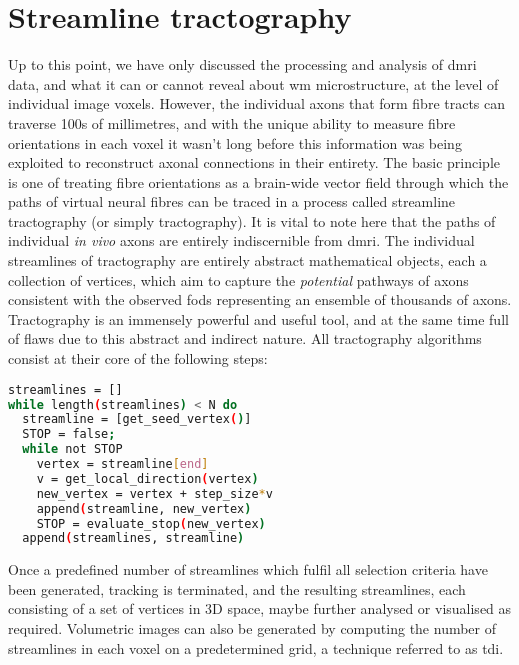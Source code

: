 \section{Streamline tractography}\label{sec:tractography}


Up to this point, we have only discussed the processing and analysis of \gls{dmri} data, and what it can or cannot reveal about \gls{wm} microstructure, at the level of individual image \glspl{voxel}.
However, the individual axons that form fibre tracts can traverse 100s of millimetres, and with the unique ability to measure fibre orientations in each voxel it wasn't long before this information was being exploited to reconstruct axonal connections in their entirety.
The basic principle is one of treating fibre orientations as a brain-wide vector field through which the paths of virtual neural fibres can be traced in a process called streamline tractography (or simply tractography).
It is vital to note here that the paths of individual \textit{in vivo} axons are entirely indiscernible from \gls{dmri}.
The individual streamlines of tractography are entirely abstract mathematical objects, each a collection of vertices, which aim to capture the \textit{potential} pathways of axons consistent with the observed \glspl{fod} representing an ensemble of thousands of axons.
Tractography is an immensely powerful and useful tool, and at the same time full of flaws due to this abstract and indirect nature.
All tractography algorithms consist at their core of the following steps:

\begin{lstlisting}[language=bash,label={lst:track},frame=single]
streamlines = []
while length(streamlines) < N do
  streamline = [get_seed_vertex()]
  STOP = false;
  while not STOP
    vertex = streamline[end]
    v = get_local_direction(vertex)
    new_vertex = vertex + step_size*v
    append(streamline, new_vertex)
    STOP = evaluate_stop(new_vertex)
  append(streamlines, streamline)
\end{lstlisting}

Once a predefined number of streamlines which fulfil all selection criteria have been generated, tracking is terminated, and the resulting streamlines, each consisting of a set of vertices in 3D space, maybe further analysed or visualised as required.
Volumetric images can also be generated by computing the number of streamlines in each voxel on a predetermined grid, a technique referred to as \gls{tdi}\autocite{Calamante2010}.

